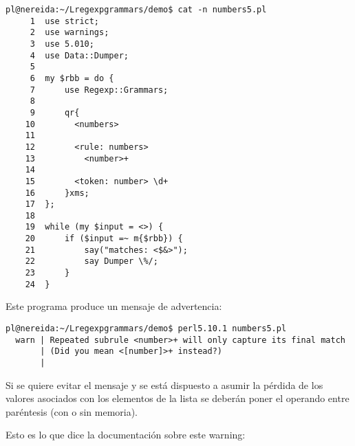 \begin{verbatim}
pl@nereida:~/Lregexpgrammars/demo$ cat -n numbers5.pl 
     1  use strict;
     2  use warnings;
     3  use 5.010;
     4  use Data::Dumper;
     5  
     6  my $rbb = do {
     7      use Regexp::Grammars;
     8  
     9      qr{
    10        <numbers>
    11  
    12        <rule: numbers> 
    13          <number>+
    14  
    15        <token: number> \d+
    16      }xms;
    17  };
    18  
    19  while (my $input = <>) {
    20      if ($input =~ m{$rbb}) {
    21          say("matches: <$&>");
    22          say Dumper \%/;
    23      }
    24  }
\end{verbatim}
Este programa produce un mensaje de advertencia:
\begin{verbatim}
pl@nereida:~/Lregexpgrammars/demo$ perl5.10.1 numbers5.pl 
  warn | Repeated subrule <number>+ will only capture its final match
       | (Did you mean <[number]>+ instead?)
       | 

\end{verbatim}

Si se quiere evitar el mensaje y se está dispuesto a asumir la pérdida
de los valores asociados con los elementos de la lista se deberán poner 
el operando entre paréntesis (con o sin memoria).

Esto es lo que dice la documentación sobre este warning:

